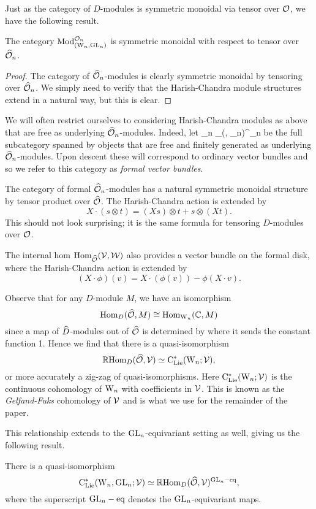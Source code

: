\documentclass[10pt]{amsart}
\begin{document}
Just as the category of $D$-modules is symmetric monoidal via tensor over $\mathcal O$, we have the following result.

\begin{lem}
The category ${\rm Mod}^{\mathcal O_n}_{({{\rm W}_n}, {\rm GL}_n)}$ is symmetric monoidal with respect to tensor over $\widehat{\mathcal O}_n$.
\end{lem} 

\begin{proof}
The category of $\widehat{\mathcal O}_n$-modules is clearly symmetric monoidal by tensoring over $\widehat{\mathcal O}_n$. We simply need to verify that the Harish-Chandra module structures extend in a natural way, but this is clear.
\end{proof}

We will often restrict ourselves to considering Harish-Chandra modules as above that are free as underlying $\widehat{\mathcal O}_n$-modules. 
Indeed, let
\ben
\VB_n \subset \Mod_{(\Vect, \GL_n)}^{\cO_n}
\een
be the full subcategory spanned by objects that are free and finitely generated as underlying $\widehat{\mathcal O}_n$-modules. 
Upon descent these will correspond to ordinary vector bundles and so
we refer to this category as {\em formal vector bundles}. 

The category of formal $\widehat{\mathcal O}_n$-modules has a natural symmetric monoidal structure by tensor product over $\widehat{\mathcal O}$. The Harish-Chandra action is extended by
\[
X \cdot (s \otimes t) = (X s) \otimes t + s \otimes (Xt). 
\]
This should not look surprising; it is the same formula for tensoring
$D$-modules over $\mathcal O$. 

The internal hom ${\rm Hom}_{\widehat{\mathcal O}}(\mathcal{V},\mathcal{W})$ also provides a vector bundle on the formal disk, 
where the Harish-Chandra action is extended by
\[
(X \cdot \phi)(v) = X \cdot (\phi(v)) - \phi(X\cdot v). 
\]

Observe that for any $D$-module $M$, we have an isomorphism
\[
{\rm Hom}_{D}(\widehat{\mathcal O}, M) \cong {\rm Hom}_{{{\rm W}_n}}(\mathbb C, M)
\]
since a map of $\widehat{D}$-modules out of $\widehat{\mathcal O}$ is determined by where it sends the constant function 1. 
Hence we find that there is a quasi-isomorphism 
\[
\mathbb R{\rm Hom}_{D}(\widehat{\mathcal O}, \mathcal{V}) \simeq {\rm C}_{{\rm Lie}}^*({{\rm W}_n} ; \mathcal{V}),
\]
or more accurately a zig-zag of quasi-isomorphisms. Here
${\rm C}_{{\rm Lie}}^*({{\rm W}_n} ; \mathcal{V})$ is the continuous cohomology of ${{\rm W}_n}$ with
coefficients in $\mathcal{V}$. This is known as the {\em Gelfand-Fuks}
cohomology of $\mathcal{V}$ and is what we use for the remainder of the
paper. 

This relationship extends to the ${\rm GL}_n$-equivariant setting as well, giving us the following result.

\begin{lem}
There is a quasi-isomorphism
\[
{\rm C}_{{\rm Lie}}^*({{\rm W}_n},{\rm GL}_n; \mathcal{V}) \simeq \mathbb R {\rm Hom}_D(\widehat{\mathcal O},\mathcal{V})^{{\rm GL}_n-{\rm eq}},
\]
where the superscript ${\rm GL}_n-{\rm eq}$ denotes the ${\rm GL}_n$-equivariant maps.
\end{lem}
\end{document}
